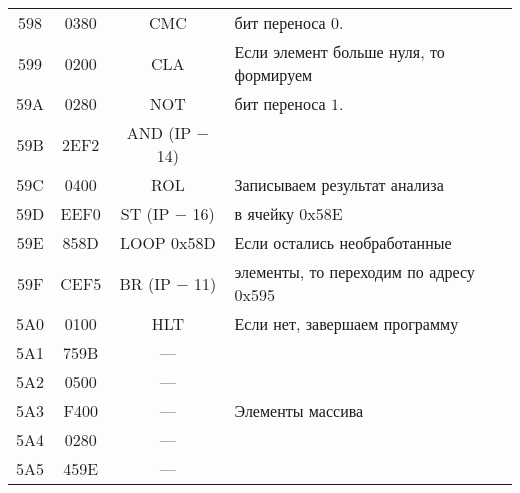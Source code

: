 \begin{center}
\begin{tabular}{|c|c|c|l|}
598 & 0380 & CMC & бит переноса $ 0 $.\\
599 & 0200 & CLA & Если элемент больше нуля, то формируем\\
59A & 0280 & NOT & бит переноса $ 1 $.\\
59B & 2EF2 & AND (IP $-$ 14) & \\
59C & 0400 & ROL & Записываем результат анализа\\
59D & EEF0 & ST (IP $-$ 16) & в ячейку 0x58E\\
59E & 858D & LOOP 0x58D & Если остались необработанные\\
59F & CEF5 & BR (IP $-$ 11) & элементы, то переходим по адресу 0x595\\
5A0 & 0100 & HLT & Если нет, завершаем программу\\
\hline
\hline
5A1 & 759B & --- & \\
5A2 & 0500 & --- & \\
5A3 & F400 & --- & Элементы массива\\
5A4 & 0280 & --- & \\
5A5 & 459E & --- & \\
\hline
\end{tabular}
\end{center}



